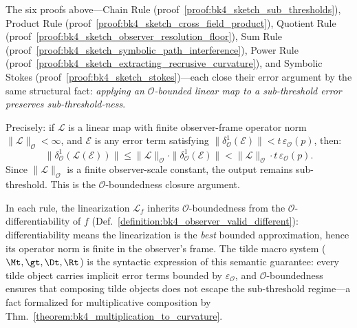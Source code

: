 \begin{scholium}
\label{scholium:bk4_o_boundedness_unifying_principle}
The six proofs above---Chain Rule
(proof~\ref{proof:bk4_sketch_sub_thresholds}),
Product Rule
(proof~\ref{proof:bk4_sketch_cross_field_product}),
Quotient Rule
(proof~\ref{proof:bk4_sketch_observer_resolution_floor}),
Sum Rule
(proof~\ref{proof:bk4_sketch_symbolic_path_interference}),
Power Rule
(proof~\ref{proof:bk4_sketch_extracting_recrusive_curvature}),
and Symbolic Stokes
(proof~\ref{proof:bk4_sketch_stokes})---each close their error argument by the
same structural fact: \emph{applying an $\mathcal{O}$-bounded linear map to a
sub-threshold error preserves sub-threshold-ness}.

Precisely: if $\mathcal{L}$ is a linear map with finite observer-frame operator
norm $\|\mathcal{L}\|_{\mathcal{O}} < \infty$, and $\mathcal{E}$ is any error term
satisfying $\|\delta^1_{\mathcal{O}}(\mathcal{E})\| < t\,\varepsilon_{\mathcal{O}}(p)$,
then:
\[
\|\delta^1_{\mathcal{O}}(\mathcal{L}(\mathcal{E}))\| \leq \|\mathcal{L}\|_{\mathcal{O}}\cdot\|\delta^1_{\mathcal{O}}(\mathcal{E})\| < \|\mathcal{L}\|_{\mathcal{O}}\cdot t\,\varepsilon_{\mathcal{O}}(p).
\]
Since $\|\mathcal{L}\|_{\mathcal{O}}$ is a finite observer-scale constant, the output
remains sub-threshold. This is the $\mathcal{O}$-boundedness closure argument.

In each rule, the linearization $\mathcal{L}_f$ inherits $\mathcal{O}$-boundedness
from the $\mathcal{O}$-differentiability of $f$ (Def.~\ref{definition:bk4_observer_valid_different}):
differentiability means the linearization is the \emph{best} bounded approximation,
hence its operator norm is finite in the observer's frame. The tilde macro system
($\Mt, \gt, \Dt, \Rt$) is the syntactic expression of this semantic guarantee: every
tilde object carries implicit error terms bounded by $\varepsilon_{\mathcal{O}}$, and
$\mathcal{O}$-boundedness ensures that composing tilde objects does not escape the
sub-threshold regime---a fact formalized for multiplicative composition by
Thm.~\ref{theorem:bk4_multiplication_to_curvature}.


\end{scholium}
